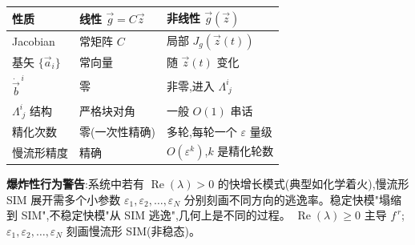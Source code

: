 \documentclass[11pt,a4paper]{article}
\newcommand{\Jg}{J_{\!g}}
\DeclareMathOperator{\Real}{Re}
\begin{document}
\begin{center}
\begin{tabular}{lll}
\hline
性质 & 线性 $\vec g=C\vec z$ & 非线性 $\vec g(\vec z)$\\
\hline
Jacobian & 常矩阵 $C$ & 局部 $\Jg(\vec z(t))$\\
基矢 $\{\vec a_i\}$ & 常向量 & 随 $\vec z(t)$ 变化\\
$\dot{\vec b}^{\,i}$ & 零 & 非零,进入 $\Lambda^{i}_{\;j}$\\
$\Lambda^{i}_{\;j}$ 结构 & 严格块对角 & 一般 $O(1)$ 串话\\
精化次数 & 零(一次性精确) & 多轮,每轮一个 $\varepsilon$ 量级\\
慢流形精度 & 精确 & $O(\varepsilon^k)$,$k$ 是精化轮数\\
\hline
\end{tabular}
\end{center}

\noindent\textbf{爆炸性行为警告}:系统中若有 $\Real(\lambda)>0$ 的快增长模式(典型如化学着火),慢流形 SIM 展开需多个小参数 $\varepsilon_1,\varepsilon_2,\dots,\varepsilon_N$ 分别刻画不同方向的逃逸率。稳定快模"塌缩到 SIM",不稳定快模"从 SIM 逃逸",几何上是不同的过程。
$\Real(\lambda)\geq 0$ 主导 $f^{\,r}$;$\varepsilon_1,\varepsilon_2,\dots,\varepsilon_N$ 刻画慢流形 SIM(非稳态)。
\end{document}
